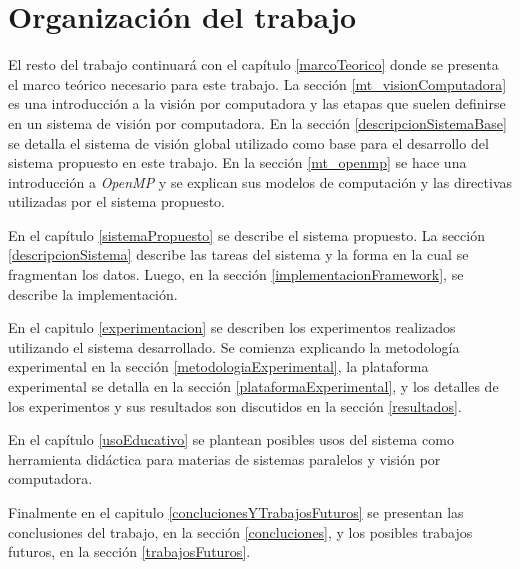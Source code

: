 
\section{Organización del trabajo}

El resto del trabajo continuará con el capítulo \ref{marcoTeorico} donde se
presenta el marco teórico necesario para este trabajo. La sección
\ref{mt_visionComputadora} es una introducción a la visión por computadora y las
etapas que suelen definirse en un sistema de visión por computadora. En la
sección \ref{descripcionSistemaBase} se detalla el sistema de visión global
utilizado como base para el desarrollo del sistema propuesto en este trabajo.
En la sección \ref{mt_openmp} se hace una introducción a \emph{OpenMP} y se
explican sus modelos de computación y las directivas utilizadas por el sistema
propuesto.

En el capítulo \ref{sistemaPropuesto} se describe el sistema propuesto. La
sección \ref{descripcionSistema} describe las tareas del sistema y la forma en
la cual se fragmentan los datos. Luego, en la sección
\ref{implementacionFramework}, se describe la implementación.

En el capitulo \ref{experimentacion} se describen los experimentos realizados
utilizando el sistema desarrollado. Se comienza explicando la metodología
experimental en la sección \ref{metodologiaExperimental}, la plataforma
experimental se detalla en la sección \ref{plataformaExperimental}, y los
detalles de los experimentos y sus resultados son discutidos en la sección
\ref{resultados}.

En el capítulo \ref{usoEducativo} se plantean posibles usos del sistema como
herramienta didáctica para materias de sistemas paralelos y visión por
computadora.

Finalmente en el capitulo \ref{conclucionesYTrabajosFuturos} se presentan las
conclusiones del trabajo, en la sección \ref{concluciones}, y los posibles
trabajos futuros, en la sección \ref{trabajosFuturos}.
